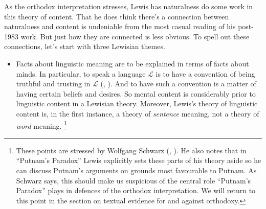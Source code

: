 \documentclass[
  10pt,
  letterpaper,
  DIV=11,
  numbers=noendperiod,
  twoside]{scrartcl}
\providecommand{\tightlist}{%
  \setlength{\itemsep}{0pt}\setlength{\parskip}{0pt}}\usepackage{longtable,booktabs,array}
\begin{document}
As the orthodox interpretation stresses, Lewis has naturalness do some
work in this theory of content. That he does think there's a connection
between naturalness and content is undeniable from the most casual
reading of his post-1983 work. But just how they are connected is less
obvious. To spell out these connections, let's start with three Lewisian
themes.

\begin{itemize}
\tightlist
\item
  Facts about linguistic meaning are to be explained in terms of facts
  about minds. In particular, to speak a language \(\mathcal{L}\) is to
  have a convention of being truthful and trusting in \(\mathcal{L}\)
  (,
  ). And to have such a convention is a
  matter of having certain beliefs and desires. So mental content is
  considerably prior to linguistic content in a Lewisian theory.
  Moreover, Lewis's theory of linguistic content is, in the first
  instance, a theory of \emph{sentence} meaning, not a theory of
  \emph{word} meaning. \footnote{These points are stressed by Wolfgang
    Schwarz (,
    ). He also notes that in ``Putnam's
    Paradox'' Lewis explicitly sets these parts of his theory aside so
    he can discuss Putnam's arguments on grounds most favourable to
    Putnam. As Schwarz says, this should make us suspicious of the
    central role ``Putnam's Paradox'' plays in defences of the orthodox
    interpretation. We will return to this point in the section on
    textual evidence for and against orthodoxy.

}
\end{itemize}
\end{document}

